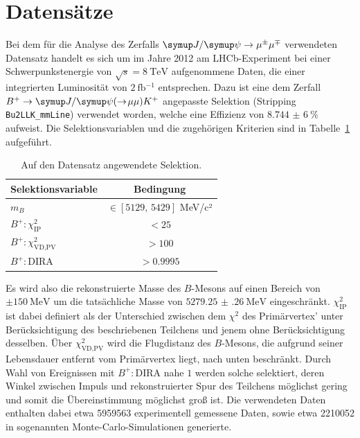 \section{Datensätze}
%
Bei dem für die Analyse des Zerfalls $\kontroll$ verwendeten Datensatz handelt es sich um im Jahre 2012 am LHCb-Experiment bei einer Schwerpunkstenergie von $\sqrt{s}=\SI{8}{\tera\electronvolt}$ aufgenommene Daten, die einer integrierten Luminosität von $\SI{2}{\femto\barn^{-1}}$ entsprechen. Dazu ist eine dem Zerfall $B^{+}\rightarrow\jpsi(\rightarrow\!\mu\mu) K^{+}$ angepasste Selektion (Stripping \texttt{Bu2LLK\_mmLine}) verwendet worden, welche eine Effizienz von $\SI{8,744(6)}{\percent}$ aufweist. Die Selektionsvariablen und die zugehörigen Kriterien sind in Tabelle~\ref{tab:bstrip} aufgeführt.
%
\begin{table}[htb]
  \centering
  \caption{Auf den Datensatz angewendete Selektion.}
  \begin{tabular}{lc}
    \toprule
    Selektionsvariable                & Bedingung      \\
    \midrule
    $m_{B}$                           & $\in[\num{5129},\,\num{5429}]$ MeV/c²  \\
    $B^{+}:\chi_{\text{IP}}^2$        & $<\num{25}$  \\
    $B^{+}:\chi_{\text{VD,PV}}^2$     & $>\num{100}$  \\
    $B^{+}:\text{DIRA}$               & $>\num{0.9995}$  \\
    \bottomrule
  \end{tabular}
  \label{tab:bstrip}
\end{table}
%
Es wird also die rekonstruierte Masse des $B$-Mesons auf einen Bereich von $\pm\SI{150}{\mega\electronvolt}$ um die tatsächliche Masse von $\SI{5279.25(26)}{\mega\electronvolt}$ eingeschränkt. $\chi_{\text{IP}}^2$ ist dabei definiert als der Unterschied zwischen dem $\chi^2$ des Primärvertex' unter Berücksichtigung des beschriebenen Teilchens und jenem ohne Berücksichtigung desselben. Über $\chi_{\text{VD,PV}}^2$ wird die Flugdistanz des $B$-Mesons, die aufgrund seiner Lebensdauer entfernt vom Primärvertex liegt, nach unten beschränkt. Durch Wahl von Ereignissen mit $B^{+}:\text{DIRA}$ nahe $1$ werden solche selektiert, deren Winkel zwischen Impuls und rekonstruierter Spur des Teilchens möglichst gering und somit die Übereinstimmung möglichst groß ist.
Die verwendeten Daten enthalten dabei etwa 5959563 experimentell gemessene Daten, sowie etwa 2210052 in sogenannten Monte-Carlo-Simulationen generierte.\\

